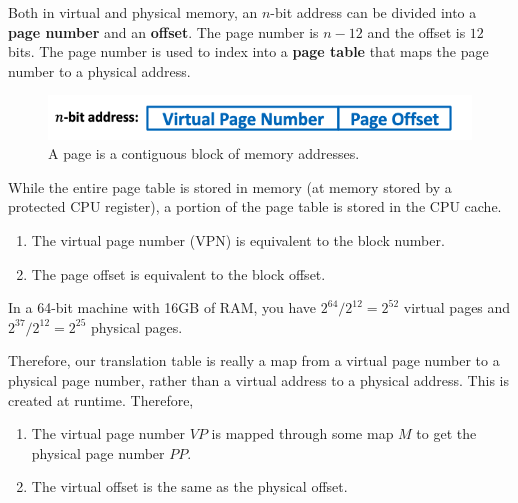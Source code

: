 \documentclass{article}
\begin{document}
    \begin{definition}[Page]
      Both in virtual and physical memory, an $n$-bit address can be divided into a \textbf{page number} and an \textbf{offset}. The page number is $n - 12$ and the offset is $12$ bits. The page number is used to index into a \textbf{page table} that maps the page number to a physical address. 
      \begin{figure}[H]
        \centering 
        \includegraphics[scale=0.4]{img/page.png}
        \caption{A page is a contiguous block of memory addresses.} 
        \label{fig:page}
      \end{figure}
      While the entire page table is stored in memory (at memory stored by a protected CPU register), a portion of the page table is stored in the CPU cache. 
      \begin{enumerate}
        \item The virtual page number (VPN) is equivalent to the block number. 
        \item The page offset is equivalent to the block offset. 
      \end{enumerate}
    \end{definition}

    \begin{example}
      In a 64-bit machine with 16GB of RAM, you have $2^{64} / 2^{12} = 2^{52}$ virtual pages and $2^{37} / 2^{12} = 2^{25}$ physical pages. 
    \end{example}

    Therefore, our translation table is really a map from a virtual page number to a physical page number, rather than a virtual address to a physical address. This is created at runtime. Therefore, 
    \begin{enumerate}
      \item The virtual page number $VP$ is mapped through some map $M$ to get the physical page number $PP$. 
      \item The virtual offset is the same as the physical offset. 
    \end{enumerate}
\end{document}

